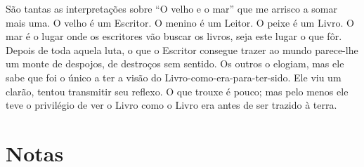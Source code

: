 São tantas as interpretações sobre “O velho e o mar” que me arrisco a
somar mais uma. O velho é um Escritor. O menino é um Leitor. O peixe
é um Livro. O mar é o lugar onde os escritores vão buscar os livros,
seja este lugar o que fôr. Depois de toda aquela luta, o que o
Escritor consegue trazer ao mundo parece-lhe um monte de despojos, de
destroços sem sentido. Os outros o elogiam, mas ele sabe que foi o
único a ter a visão do Livro-como-era-para-ter-sido. Ele viu um
clarão, tentou transmitir seu reflexo. O que trouxe é pouco; mas pelo
menos ele teve o privilégio de ver o Livro como o Livro era antes de
ser trazido à terra.

\chapter{Notas}


